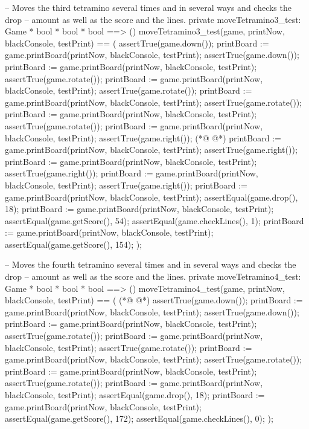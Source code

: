 \begin{vdmpp}[breaklines=true]
  -- Moves the third tetramino several times and in several ways and checks the drop
  -- amount as well as the score and the lines.
  private moveTetramino3_test: Game * bool * bool * bool ==> ()
  moveTetramino3_test(game, printNow, blackConsole, testPrint) == (
   assertTrue(game.down());
   printBoard := game.printBoard(printNow, blackConsole, testPrint);
   assertTrue(game.down());
   printBoard := game.printBoard(printNow, blackConsole, testPrint);
   assertTrue(game.rotate());
   printBoard := game.printBoard(printNow, blackConsole, testPrint);
   assertTrue(game.rotate());
   printBoard := game.printBoard(printNow, blackConsole, testPrint);
   assertTrue(game.rotate());
   printBoard := game.printBoard(printNow, blackConsole, testPrint);
   assertTrue(game.rotate());
   printBoard := game.printBoard(printNow, blackConsole, testPrint);
   assertTrue(game.right());
(*@
\label{moveTetramino4:test:355}
@*)
   printBoard := game.printBoard(printNow, blackConsole, testPrint);
   assertTrue(game.right());
   printBoard := game.printBoard(printNow, blackConsole, testPrint);
   assertTrue(game.right());
   printBoard := game.printBoard(printNow, blackConsole, testPrint);
   assertTrue(game.right());
   printBoard := game.printBoard(printNow, blackConsole, testPrint);
   assertEqual(game.drop(), 18);
   printBoard := game.printBoard(printNow, blackConsole, testPrint);
   assertEqual(game.getScore(), 54);
   assertEqual(game.checkLines(), 1);
   printBoard := game.printBoard(printNow, blackConsole, testPrint);
   assertEqual(game.getScore(), 154);
  );
  
  -- Moves the fourth tetramino several times and in several ways and checks the drop
  -- amount as well as the score and the lines.
  private moveTetramino4_test: Game * bool * bool * bool ==> ()
  moveTetramino4_test(game, printNow, blackConsole, testPrint) == (
(*@
\label{moveTetramino5:test:374}
@*)
   assertTrue(game.down());
   printBoard := game.printBoard(printNow, blackConsole, testPrint);
   assertTrue(game.down());
   printBoard := game.printBoard(printNow, blackConsole, testPrint);
   assertTrue(game.rotate());
   printBoard := game.printBoard(printNow, blackConsole, testPrint);
   assertTrue(game.rotate());
   printBoard := game.printBoard(printNow, blackConsole, testPrint);
   assertTrue(game.rotate());
   printBoard := game.printBoard(printNow, blackConsole, testPrint);
   assertTrue(game.rotate());
   printBoard := game.printBoard(printNow, blackConsole, testPrint);
   assertEqual(game.drop(), 18);
   printBoard := game.printBoard(printNow, blackConsole, testPrint);
   assertEqual(game.getScore(), 172);
   assertEqual(game.checkLines(), 0);
  );
  

\end{vdmpp}
